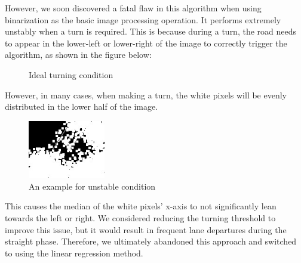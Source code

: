 \documentclass[12pt, a4paper, oneside]{report}
\begin{document}
However, we soon discovered a fatal flaw in this algorithm when using binarization as the basic image processing operation. It performs extremely unstably when a turn is required. This is because during a turn, the road needs to appear in the lower-left or lower-right of the image to correctly trigger the algorithm, as shown in the figure below:

\begin{figure}[H]
  \centering
  \hspace{0.5cm}
  \caption{Ideal turning condition}
  \label{fig:twosubfigures}
\end{figure}

However, in many cases, when making a turn, the white pixels will be evenly distributed in the lower half of the image. 

\begin{figure}[H]
  \centering
  \includegraphics[width=0.3\textwidth]{pic/Tracing/wrong.jpg}
  \caption{An example for unstable condition}
  \label{fig:example}
\end{figure}

This causes the median of the white pixels' x-axis to not significantly lean towards the left or right. We considered reducing the turning threshold to improve this issue, but it would result in frequent lane departures during the straight phase. Therefore, we ultimately abandoned this approach and switched to using the linear regression method.
\end{document}
